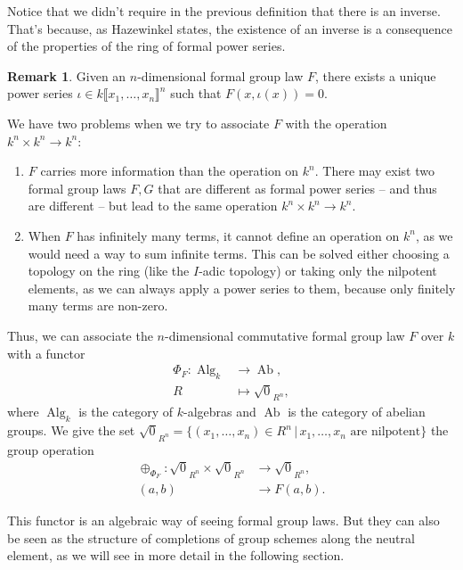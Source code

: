 \documentclass{report}
\DeclareMathOperator{\Alg}{Alg}
\DeclareMathOperator{\Ab}{Ab}
\theoremstyle{definition}
\newtheorem{remark}[theorem]{Remark}
\begin{document}
Notice that we didn't require in the previous definition that there is an inverse. That's because, as Hazewinkel \cite[Section~II.9.1]{hazewinkel1978formal} states, the existence of an inverse is a consequence of the properties of the ring of formal power series.

\begin{remark}
Given an $n$-dimensional formal group law $F$, there exists a unique power series $\iota\in k\llbracket x_1,\ldots,x_n\rrbracket^n$ such that $F(x,\iota(x))=0$.
\end{remark}

We have two problems when we try to associate $F$ with the operation $k^n\times k^n\rightarrow k^n$:
\begin{enumerate}
\item $F$ carries more information than the operation on $k^n$. There may exist two formal group laws $F,G$ that are different as formal power series -- and thus are different -- but lead to the same operation $k^n\times k^n\rightarrow k^n$.

\item When $F$ has infinitely many terms, it cannot define an operation on $k^n$, as we would need a way to sum infinite terms. This can be solved either choosing a topology on the ring (like the $I$-adic topology) or taking only the nilpotent elements, as we can always apply a power series to them, because only finitely many terms are non-zero.
\end{enumerate}

Thus, we can associate the $n$-dimensional commutative formal group law $F$ over $k$ with a functor
\begin{align*}
\Phi_F:\Alg_k&\longrightarrow\Ab,\\
R&\longmapsto\sqrt{0}_{R^n},
\end{align*}
where $\Alg_k$ is the category of $k$-algebras and $\Ab$ is the category of abelian groups. We give the set $\sqrt{0}_{R^n}=\{(x_1,\ldots,x_n)\in R^n\,|\,x_1,\ldots,x_n\text{ are nilpotent}\}$ the group operation
\begin{align*}
\oplus_{\Phi_F}:\sqrt{0}_{R^n}\times\sqrt{0}_{R^n}&\longrightarrow\sqrt{0}_{R^n},\\
(a,b)&\longrightarrow F(a,b).
\end{align*}

This functor is an algebraic way of seeing formal group laws. But they can also be seen as the structure of completions of group schemes along the neutral element, as we will see in more detail in the following section.
\end{document}
